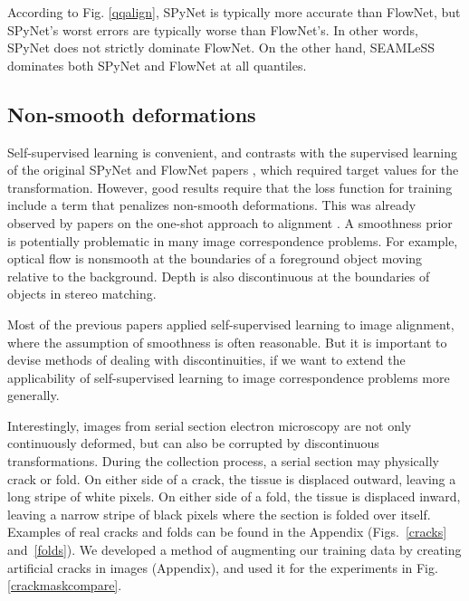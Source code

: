 \documentclass{article}
\begin{document}
According to Fig. \ref{qqalign}, SPyNet is typically more accurate than FlowNet, but SPyNet's worst errors are typically worse than FlowNet's. In other words, SPyNet does not strictly dominate FlowNet. On the other hand, SEAMLeSS dominates both SPyNet and FlowNet at all quantiles. 

\subsection{Non-smooth deformations}
Self-supervised learning is convenient, and contrasts with the supervised learning of the original SPyNet and FlowNet papers \citep{ranjan2017optical,flownet}, which required target values for the transformation. However, good results require that the loss function for training include a term that penalizes non-smooth deformations. This was already observed by papers on the one-shot approach to alignment \citep{balakrishnan2018unsupervised,flownet,yoo2017ssemnet}. A smoothness prior is potentially problematic in many image correspondence problems. For example, optical flow is nonsmooth at the boundaries of a foreground object moving relative to the background. Depth is also discontinuous at the boundaries of objects in stereo matching.

Most of the previous papers applied self-supervised learning to image alignment, where the assumption of smoothness is often reasonable. But it is important to devise methods of dealing with discontinuities, if we want to extend the applicability of self-supervised learning to image correspondence problems more generally.

Interestingly, images from serial section electron microscopy are not only continuously deformed, but can also be corrupted by discontinuous transformations. During the collection process, a serial section may physically crack or fold. On either side of a crack, the tissue is displaced outward, leaving a long stripe of white pixels. On either side of a fold, the tissue is displaced inward, leaving a narrow stripe of black pixels where the section is folded over itself. Examples of real cracks and folds can be found in the Appendix (Figs.~\ref{cracks} and~\ref{folds}). We developed a method of augmenting our training data by creating artificial cracks in images (Appendix), and used it for the experiments in Fig. \ref{crackmaskcompare}.

\end{document}
